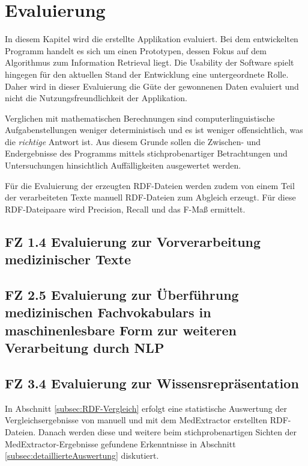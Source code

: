 \chapter{Evaluierung}
\label{ch:evaluierung}

In diesem Kapitel wird die erstellte Applikation evaluiert. Bei dem entwickelten Programm handelt es sich um einen Prototypen, dessen Fokus auf dem Algorithmus zum Information Retrieval liegt. Die Usability der Software spielt hingegen für den aktuellen Stand der Entwicklung eine untergeordnete Rolle. Daher wird in dieser Evaluierung die Güte der gewonnenen Daten evaluiert und nicht die Nutzungsfreundlichkeit der Applikation.

 
Verglichen mit mathematischen Berechnungen sind computerlinguistische Aufgabenstellungen weniger deterministisch und es ist weniger offensichtlich, was die \emph{richtige} Antwort ist.  Aus diesem Grunde sollen die Zwischen- und Endergebnisse des Programms mittels stichprobenartiger Betrachtungen und Untersuchungen hinsichtlich Auffälligkeiten ausgewertet werden. 

Für die Evaluierung der erzeugten RDF-Dateien werden zudem von einem Teil der verarbeiteten Texte manuell RDF-Dateien zum Abgleich erzeugt. Für diese RDF-Dateipaare wird Precision, Recall und das F-Maß ermittelt.


\section{FZ 1.4 Evaluierung zur Vorverarbeitung medizinischer Texte}
\label{sec:FZ1.4} 




\section[FZ 2.5 Evaluierung zur Überführung med. Fachvokabulars]{FZ 2.5 Evaluierung zur Überführung medizinischen Fachvokabulars in maschinenlesbare Form zur weiteren Verarbeitung durch NLP}
\label{sec:FZ2.5}



\section{FZ 3.4 Evaluierung zur Wissensrepräsentation}
\label{sec:FZ3.4} 
In Abschnitt \ref{subsec:RDF-Vergleich} erfolgt eine statistische Auswertung der Vergleichsergebnisse von manuell und mit dem MedExtractor erstellten RDF-Dateien. Danach werden diese und weitere beim stichprobenartigen Sichten der Med\-Extractor-Ergebnisse gefundene Erkenntnisse in Abschnitt \ref{subsec:detaillierteAuswertung} diskutiert.



